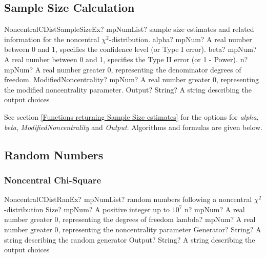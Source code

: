 \subsection{Sample Size Calculation}
\label{NoncentralChiSquareDistributionSampleSizeEx}

\begin{mpFunctionsExtract}
	\mpFunctionFiveNotImplemented
	{NoncentralCDistSampleSizeEx? mpNumList? sample size estimates and related information for the noncentral $\chi^2$-distribution.}
	{alpha? mpNum? A real number between 0 and 1, specifies the confidence level (or Type I error).}
	{beta? mpNum?  A real number between 0 and 1, specifies the Type II error (or 1 - Power).}
	{n? mpNum? A real number greater 0, representing the denominator degrees of freedom.}
	{ModifiedNoncentrality? mpNum? A real number greater 0, representing the modified noncentrality parameter.}
	{Output? String? A string describing the output choices}
\end{mpFunctionsExtract}


\vspace{0.3cm}
See section \ref{Functions returning Sample Size estimates} for the options for  {\itshape\sffamily alpha}, {\itshape\sffamily beta}, {\itshape\sffamily ModifiedNoncentrality} and {\itshape\sffamily Output}. Algorithms and formulas are given below.



\subsection{Random Numbers}

\subsubsection{Noncentral Chi-Square}
\label{NoncentralChiSquareDistributionRandomEx}


\begin{mpFunctionsExtract}
	\mpFunctionFiveNotImplemented
	{NoncentralCDistRanEx? mpNumList? random numbers following a noncentral $\chi^2$-distribution}
	{Size? mpNum? A positive integer up to $10^7$}
	{n? mpNum? A real number greater 0, representing the degrees of freedom}
	{lambda? mpNum? A real number greater 0, representing the noncentrality parameter}
	{Generator? String? A string describing the random generator}
	{Output? String? A string describing the output choices}
\end{mpFunctionsExtract}


